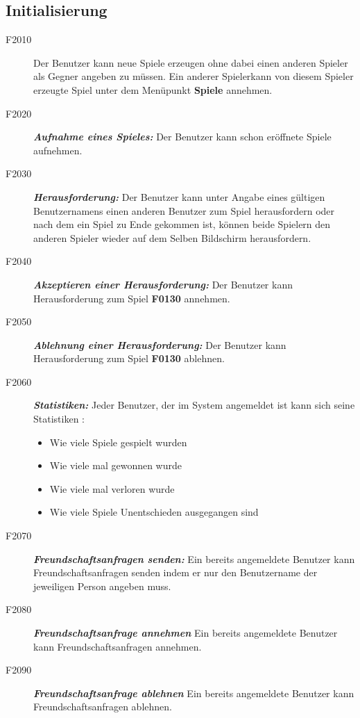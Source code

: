 \documentclass[parskip=full]{scrartcl}
\begin{document}
\subsection{Initialisierung}
\begin{description}
	\item[F2010] Der Benutzer kann neue Spiele erzeugen ohne dabei einen anderen \gls{Spieler} als Gegner angeben zu müssen. Ein anderer \gls{Spieler}kann von diesem \gls{Spieler} erzeugte Spiel unter dem Menüpunkt \textbf{Spiele} annehmen.
	\item[F2020] \textbf{\textit{Aufnahme eines Spieles: }} Der Benutzer kann schon eröffnete Spiele aufnehmen.
	\item[F2030] \textbf{\textit{Herausforderung: }} Der Benutzer kann unter Angabe eines gültigen Benutzernamens einen anderen Benutzer zum Spiel herausfordern oder nach dem ein Spiel zu Ende gekommen ist, können beide Spielern den anderen Spieler wieder auf dem Selben Bildschirm herausfordern.
	\item [F2040] \textbf{\textit{Akzeptieren einer Herausforderung: }} Der Benutzer kann Herausforderung zum Spiel \textbf{F0130} annehmen.
	\item [F2050] \textbf{\textit{Ablehnung einer Herausforderung: }} Der Benutzer kann Herausforderung zum Spiel \textbf{F0130} ablehnen.
	\item [F2060] \textbf{\textit{Statistiken: }} Jeder Benutzer, der im System angemeldet ist kann sich seine Statistiken :
	\begin{itemize}
		\item Wie viele Spiele gespielt wurden
		\item Wie viele mal gewonnen wurde
		\item Wie viele mal verloren wurde
		\item Wie viele Spiele Unentschieden ausgegangen sind
	\end{itemize}
	\item[F2070] \textbf{\textit{Freundschaftsanfragen senden: }}
	Ein bereits angemeldete Benutzer kann Freundschaftsanfragen senden indem er nur den Benutzername der jeweiligen Person angeben muss.
	\item[F2080] \textbf{\textit{Freundschaftsanfrage annehmen }} Ein bereits angemeldete Benutzer kann Freundschaftsanfragen annehmen.
	\item[F2090] \textbf{\textit{Freundschaftsanfrage ablehnen }} Ein bereits angemeldete Benutzer kann Freundschaftsanfragen ablehnen.
	
\end{description}
\end{document}

